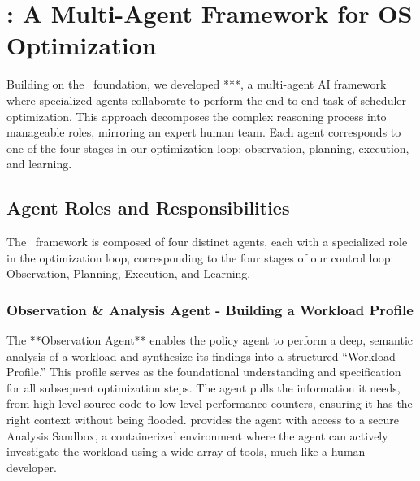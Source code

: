 \section{\agent: A Multi-Agent Framework for OS Optimization}
\label{sec:sched_agents}

Building on the \sys\ foundation, we developed **\agent**, a multi-agent AI framework where specialized agents collaborate to perform the end-to-end task of scheduler optimization. This approach decomposes the complex reasoning process into manageable roles, mirroring an expert human team. Each agent corresponds to one of the four stages in our optimization loop: observation, planning, execution, and learning.

\subsection{Agent Roles and Responsibilities}
The \agent\ framework is composed of four distinct agents, each with a specialized role in the optimization loop, corresponding to the four stages of our control loop: Observation, Planning, Execution, and Learning.

\subsubsection{Observation \& Analysis Agent - Building a Workload Profile}

The **Observation Agent** enables the policy agent to perform a deep, semantic analysis of a workload and synthesize its findings into a structured ``Workload Profile.'' This profile serves as the foundational understanding and specification for all subsequent optimization steps. The agent pulls the information it needs, from high-level source code to low-level performance counters, ensuring it has the right context without being flooded. \sys provides the agent with access to a secure Analysis Sandbox, a containerized environment where the agent can actively investigate the workload using a wide array of tools, much like a human developer.

